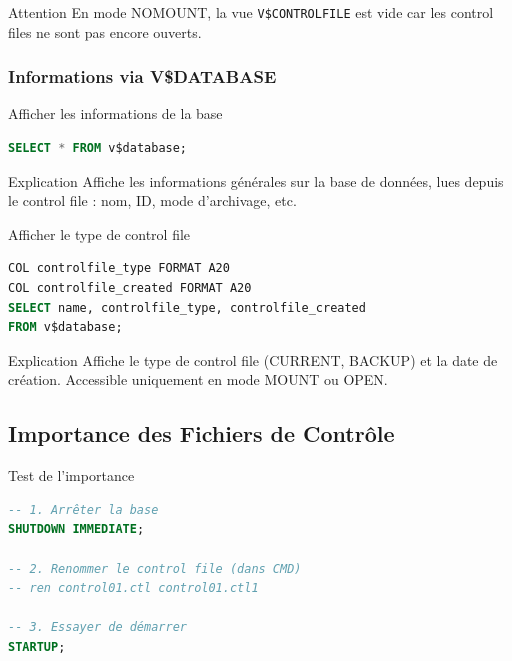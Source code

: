 \documentclass[12pt,a4paper]{article}
\begin{document}
\begin{attention}{Attention}
En mode NOMOUNT, la vue \texttt{V\$CONTROLFILE} est vide car les control files ne sont pas encore ouverts.
\end{attention}

\subsubsection{Informations via V\$DATABASE}

\begin{commande}{Afficher les informations de la base}
\begin{lstlisting}[language=SQL]
SELECT * FROM v$database;
\end{lstlisting}
\end{commande}

\begin{explication}{Explication}
Affiche les informations générales sur la base de données, lues depuis le control file : nom, ID, mode d'archivage, etc.
\end{explication}

\begin{commande}{Afficher le type de control file}
\begin{lstlisting}[language=SQL]
COL controlfile_type FORMAT A20
COL controlfile_created FORMAT A20
SELECT name, controlfile_type, controlfile_created 
FROM v$database;
\end{lstlisting}
\end{commande}

\begin{explication}{Explication}
Affiche le type de control file (CURRENT, BACKUP) et la date de création. Accessible uniquement en mode MOUNT ou OPEN.
\end{explication}

\subsection{Importance des Fichiers de Contrôle}

\begin{attention}{Test de l'importance}
\begin{lstlisting}[language=SQL]
-- 1. Arrêter la base
SHUTDOWN IMMEDIATE;

-- 2. Renommer le control file (dans CMD)
-- ren control01.ctl control01.ctl1

-- 3. Essayer de démarrer
STARTUP;
\end{lstlisting}
\end{attention}
\end{document}
